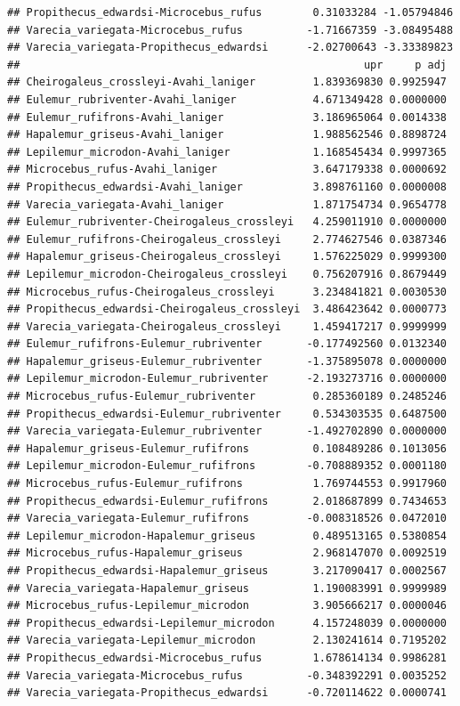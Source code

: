 \documentclass[
  12pt,
]{article}
\begin{document}
\begin{verbatim}
## Propithecus_edwardsi-Microcebus_rufus        0.31033284 -1.05794846
## Varecia_variegata-Microcebus_rufus          -1.71667359 -3.08495488
## Varecia_variegata-Propithecus_edwardsi      -2.02700643 -3.33389823
##                                                      upr     p adj
## Cheirogaleus_crossleyi-Avahi_laniger         1.839369830 0.9925947
## Eulemur_rubriventer-Avahi_laniger            4.671349428 0.0000000
## Eulemur_rufifrons-Avahi_laniger              3.186965064 0.0014338
## Hapalemur_griseus-Avahi_laniger              1.988562546 0.8898724
## Lepilemur_microdon-Avahi_laniger             1.168545434 0.9997365
## Microcebus_rufus-Avahi_laniger               3.647179338 0.0000692
## Propithecus_edwardsi-Avahi_laniger           3.898761160 0.0000008
## Varecia_variegata-Avahi_laniger              1.871754734 0.9654778
## Eulemur_rubriventer-Cheirogaleus_crossleyi   4.259011910 0.0000000
## Eulemur_rufifrons-Cheirogaleus_crossleyi     2.774627546 0.0387346
## Hapalemur_griseus-Cheirogaleus_crossleyi     1.576225029 0.9999300
## Lepilemur_microdon-Cheirogaleus_crossleyi    0.756207916 0.8679449
## Microcebus_rufus-Cheirogaleus_crossleyi      3.234841821 0.0030530
## Propithecus_edwardsi-Cheirogaleus_crossleyi  3.486423642 0.0000773
## Varecia_variegata-Cheirogaleus_crossleyi     1.459417217 0.9999999
## Eulemur_rufifrons-Eulemur_rubriventer       -0.177492560 0.0132340
## Hapalemur_griseus-Eulemur_rubriventer       -1.375895078 0.0000000
## Lepilemur_microdon-Eulemur_rubriventer      -2.193273716 0.0000000
## Microcebus_rufus-Eulemur_rubriventer         0.285360189 0.2485246
## Propithecus_edwardsi-Eulemur_rubriventer     0.534303535 0.6487500
## Varecia_variegata-Eulemur_rubriventer       -1.492702890 0.0000000
## Hapalemur_griseus-Eulemur_rufifrons          0.108489286 0.1013056
## Lepilemur_microdon-Eulemur_rufifrons        -0.708889352 0.0001180
## Microcebus_rufus-Eulemur_rufifrons           1.769744553 0.9917960
## Propithecus_edwardsi-Eulemur_rufifrons       2.018687899 0.7434653
## Varecia_variegata-Eulemur_rufifrons         -0.008318526 0.0472010
## Lepilemur_microdon-Hapalemur_griseus         0.489513165 0.5380854
## Microcebus_rufus-Hapalemur_griseus           2.968147070 0.0092519
## Propithecus_edwardsi-Hapalemur_griseus       3.217090417 0.0002567
## Varecia_variegata-Hapalemur_griseus          1.190083991 0.9999989
## Microcebus_rufus-Lepilemur_microdon          3.905666217 0.0000046
## Propithecus_edwardsi-Lepilemur_microdon      4.157248039 0.0000000
## Varecia_variegata-Lepilemur_microdon         2.130241614 0.7195202
## Propithecus_edwardsi-Microcebus_rufus        1.678614134 0.9986281
## Varecia_variegata-Microcebus_rufus          -0.348392291 0.0035252
## Varecia_variegata-Propithecus_edwardsi      -0.720114622 0.0000741
\end{verbatim}
\end{document}
